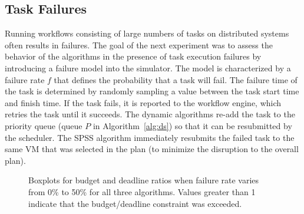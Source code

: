 \documentclass[conference]{IEEEtran}
\begin{document}
\subsection{Task Failures}
\label{sec:failures}

Running workflows consisting of large numbers of tasks on distributed systems
often results in failures. The goal of the next experiment was to assess the
behavior of the algorithms in the presence of task execution failures by
introducing a failure model into the simulator. The model is characterized by
a failure rate $f$ that defines the probability that a task will fail. The
failure time of the task is determined by randomly sampling a value between
the task start time and finish time. If the task fails, it is reported to the
workflow engine, which retries the task until it succeeds. The dynamic
algorithms re-add the task to the priority queue (queue $P$ in
Algorithm~\ref{alg:ds}) so that it can be resubmitted by the scheduler. The
SPSS algorithm immediately  resubmits the failed task to the same VM that was
selected in the plan (to minimize the disruption to the overall plan).

\begin{figure}[tb]
    \hspace{2cm}
    \caption{Boxplots for budget and deadline ratios when failure rate varies
    from 0\% to 50\% for all three algorithms. Values greater than 1 indicate 
    that the budget/deadline constraint was exceeded.}
    \label{fig:failures}
\end{figure}
\end{document}
